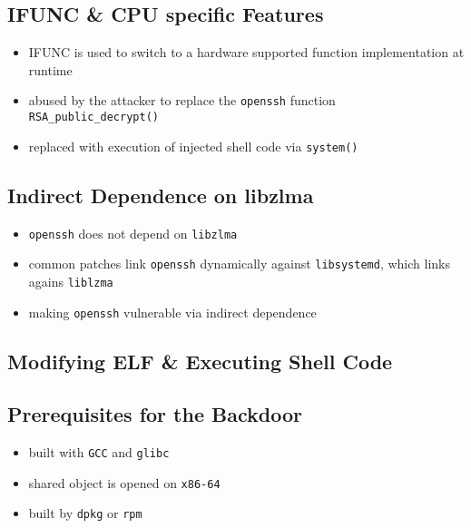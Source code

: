 \subsection{IFUNC \& CPU specific Features}

\begin{itemize}
    \item IFUNC is used to switch to a hardware supported function implementation at runtime
    \item abused by the attacker to replace the \texttt{openssh} function \texttt{RSA\_public\_decrypt()}
    \item replaced with execution of injected shell code via \texttt{system()}
\end{itemize}

\subsection{Indirect Dependence on libzlma}

\begin{itemize}
    \item \texttt{openssh} does not depend on \texttt{libzlma}
    \item common patches link \texttt{openssh} dynamically against \texttt{libsystemd}, which links agains \texttt{liblzma}
    \item making \texttt{openssh} vulnerable via indirect dependence
\end{itemize}

\subsection{Modifying ELF \& Executing Shell Code}

\subsection{Prerequisites for the Backdoor}

\begin{itemize}
    \item built with \texttt{GCC} and \texttt{glibc}
    \item shared object is opened on \texttt{x86-64}
    \item built by \texttt{dpkg} or \texttt{rpm}
\end{itemize}

